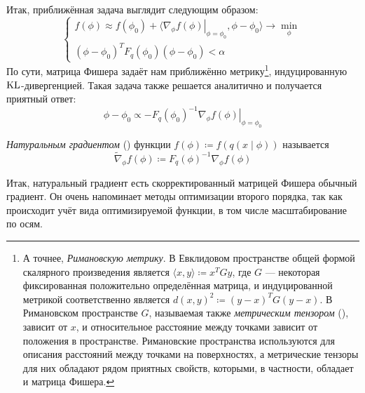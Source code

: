 Итак, приближённая задача выглядит следующим образом:
$$\begin{cases}
f(\phi) \approx f(\phi_0) + \langle \left. \nabla_\phi f(\phi) \right|_{\phi = \phi_0}, \phi - \phi_0 \rangle \to \min\limits_{\phi} \\
(\phi - \phi_0)^T F_q(\phi_0) (\phi - \phi_0) < \alpha
\end{cases}$$
По сути, матрица Фишера задаёт нам приближённо метрику\footnote{А точнее, \emph{Римановскую метрику}. В Евклидовом пространстве общей формой скалярного произведения является $\langle x, y \rangle \coloneqq x^TGy$, где $G$ --- некоторая фиксированная положительно определённая матрица, и индуцированной метрикой соответственно является $d(x, y)^2 \coloneqq  (y - x)^T G (y - x)$. В Римановском пространстве $G$, называемая также \emph{метрическим тензором} (), зависит от $x$, и относительное расстояние между точками зависит от положения в пространстве. Римановские пространства используются для описания расстояний между точками на поверхностях, а метрические тензоры для них обладают рядом приятных свойств, которыми, в частности, обладает и матрица Фишера.}, индуцированную $\operatorname{KL}$-дивергенцией. Такая задача также решается аналитично и получается приятный ответ:
\begin{equation}\label{naturalgradient}
\phi - \phi_0 \propto -F_q(\phi_0)^{-1} \left. \nabla_\phi f(\phi) \right|_{\phi = \phi_0}
\end{equation}

\begin{definition}
\emph{Натуральным градиентом} () функции $f(\phi) \coloneqq f(q(x \mid \phi))$ называется
$$\tilde{\nabla}_\phi f(\phi) \coloneqq F_q(\phi)^{-1} \nabla_\phi f(\phi)$$
\end{definition}

Итак, натуральный градиент есть скорректированный матрицей Фишера обычный градиент. Он очень напоминает методы оптимизации второго порядка, так как происходит учёт вида оптимизируемой функции, в том числе масштабирование по осям.


